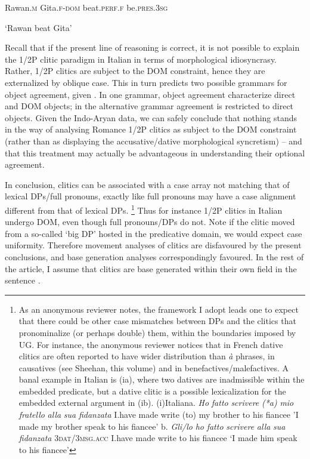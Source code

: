 \documentclass[output=paper,nonflat,modfonts]{langsci/langscibook}
\begin{document}
\begin{styleNoSpacing}
  Rawan\textsc{.m}   Gita.\textsc{f-dom}   beat.\textsc{perf.f}    be.\textsc{pres.3sg}
\end{styleNoSpacing}

  ‘Rawan beat Gita’

Recall that if the present line of reasoning is correct, it is not possible to explain the 1/2P clitic paradigm in Italian in terms of morphological idiosyncrasy. Rather, 1/2P clitics are subject to the DOM constraint, hence they are externalized by oblique case. This in turn predicts two possible grammars for object agreement, given . In one grammar, object agreement characterize direct and DOM objects; in the alternative grammar agreement is restricted to direct objects. Given the Indo-Aryan data, we can safely conclude that nothing stands in the way of analysing Romance 1/2P clitics as subject to the DOM constraint (rather than as displaying the accusative/dative morphological syncretism) – and that this treatment may actually be advantageous in understanding their optional agreement. 

In conclusion, clitics can be associated with a case array not matching that of lexical DPs/full pronouns, exactly like full pronouns may have a case alignment different from that of lexical DPs.\textstyleFootnoteSymbol{} \footnote{As an anonymous reviewer notes, the framework I adopt leads one to expect that there could be other case mismatches between DPs and the clitics that pronominalize (or perhaps double) them, within the boundaries imposed by UG. For instance, the anonymous reviewer notices that in French dative clitics are often reported to have wider distribution than \textit{à} phrases, in causatives (see Sheehan, this volume) and in benefactives/malefactives. A banal example in Italian is (ia), where two datives are inadmissible within the embedded predicate, but a dative clitic is a possible lexicalization for the embedded external argument in (ib). \textrm{(i)Italian}\textrm{a.} \textrm{\textit{Ho} \textit{fatto} \textit{scrivere} \textit{(*a)} \textit{mio} \textit{fratello} \textit{alla} \textit{sua} \textit{fidanzata}} \textrm{I.have made write (to) my brother to his fiancee} \textrm{{}'I made my brother speak to his fiancee'} \textrm{b.} \textrm{\textit{Gli/lo}     \textit{ho} \textit{fatto} \textit{scrivere}   \textit{alla} \textit{sua} \textit{fidanzata}} \textrm{3}\textrm{\textsc{dat}}\textrm{/}\textrm{\textsc{3msg.acc} }\textrm{I.have made write   to his fiancee} \textrm{‘I made him speak to his fiancee’}} Thus for instance 1/2P clitics in Italian undergo DOM, even though full pronouns/DPs do not. Note if the clitic moved from a so-called ‘big DP’ hosted in the predicative domain, we would expect case uniformity. Therefore movement analyses of clitics are disfavoured by the present conclusions, and base generation analyses correspondingly favoured. In the rest of the article, I assume that clitics are base generated within their own field in the sentence \citep{Sportiche1996}.
\end{document}
